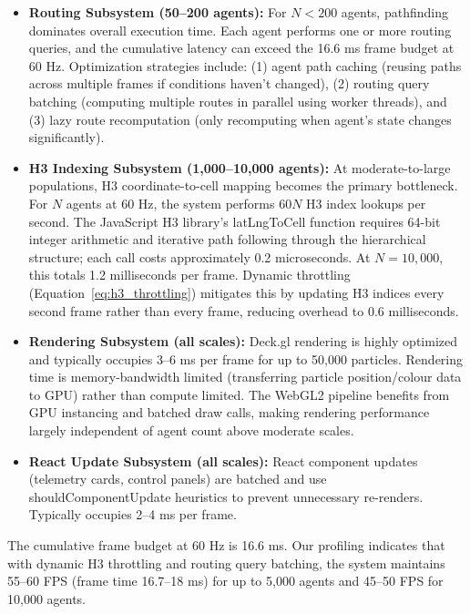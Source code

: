 \documentclass[12pt,a4paper,oneside]{report}
\begin{document}
\begin{itemize}
    \item \textbf{Routing Subsystem (50--200 agents):} For $N < 200$ agents, pathfinding dominates overall execution time. Each agent performs one or more routing queries, and the cumulative latency can exceed the 16.6 ms frame budget at 60 Hz. Optimization strategies include: (1) agent path caching (reusing paths across multiple frames if conditions haven't changed), (2) routing query batching (computing multiple routes in parallel using worker threads), and (3) lazy route recomputation (only recomputing when agent's state changes significantly).
    
    \item \textbf{H3 Indexing Subsystem (1,000--10,000 agents):} At moderate-to-large populations, H3 coordinate-to-cell mapping becomes the primary bottleneck. For $N$ agents at 60 Hz, the system performs $60N$ H3 index lookups per second. The JavaScript H3 library's latLngToCell function requires 64-bit integer arithmetic and iterative path following through the hierarchical structure; each call costs approximately 0.2 microseconds. At $N = 10,000$, this totals 1.2 milliseconds per frame. Dynamic throttling (Equation~\ref{eq:h3_throttling}) mitigates this by updating H3 indices every second frame rather than every frame, reducing overhead to 0.6 milliseconds.
    
    \item \textbf{Rendering Subsystem (all scales):} Deck.gl rendering is highly optimized and typically occupies 3--6 ms per frame for up to 50,000 particles. Rendering time is memory-bandwidth limited (transferring particle position/colour data to GPU) rather than compute limited. The WebGL2 pipeline benefits from GPU instancing and batched draw calls, making rendering performance largely independent of agent count above moderate scales.
    
    \item \textbf{React Update Subsystem (all scales):} React component updates (telemetry cards, control panels) are batched and use shouldComponentUpdate heuristics to prevent unnecessary re-renders. Typically occupies 2--4 ms per frame.
\end{itemize}

The cumulative frame budget at 60 Hz is 16.6 ms. Our profiling indicates that with dynamic H3 throttling and routing query batching, the system maintains 55--60 FPS (frame time 16.7--18 ms) for up to 5,000 agents and 45--50 FPS for 10,000 agents.
\end{document}
